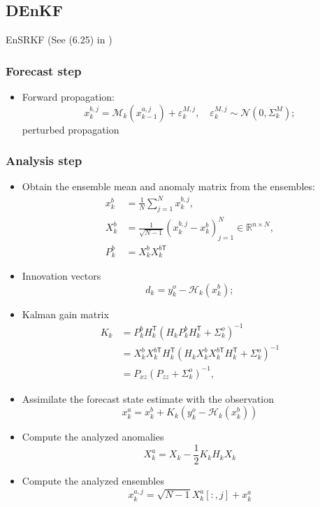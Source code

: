 \documentclass{article}
\newcommand{\trans}{\mathsf{T}}
\begin{document}
\subsection{DEnKF}
EnSRKF (See (6.25) in \cite{Bocquet2016})
\subsubsection{Forecast step}
\begin{itemize}
	\item Forward propagation:
	      $$
		      x_k^{b,j}=\mathcal{M}_k(x_{k-1}^{a,j})+\varepsilon_k^{M,j},\quad \varepsilon_k^{M,j}\sim\mathcal{N}(0,\Sigma_k^M);
	      $$
	      perturbed propagation
\end{itemize}

\subsubsection{Analysis step}
\begin{itemize}
	\item Obtain the ensemble mean and anomaly matrix from the ensembles:
	      \begin{align*}
		      x_k^b & = \frac1N\sum_{j=1}^Nx_k^{b,j},                                           \\
		      X_k^b & = \frac1{\sqrt{N-1}}(x_k^{b,j} - x_k^b)_{j=1}^N\in\mathbb{R}^{n\times N}, \\
		      P_k^b & = X_k^bX_k^{b\trans}
	      \end{align*}
	\item Innovation vectors
	      $$
		      d_k = y_k^o - \mathcal{H}_k(x_k^b);
	      $$
	\item Kalman gain matrix
	      \begin{align*}
		      K_k & = P_k^bH_k^\trans (H_kP_k^bH_k^\trans +\Sigma_k^o)^{-1}                           \\
		          & = X_k^bX_k^{b\trans}H_k^\trans (H_kX_k^bX_k^{b\trans}H_k^\trans +\Sigma_k^o)^{-1} \\
		          & = P_{xz}(P_{zz}+\Sigma_k^o)^{-1},
	      \end{align*}
	\item Assimilate the forecast state estimate with the observation
	      $$
		      x_k^a = x_k^b + K_k(y_k^o - \mathcal{H}_k(x_k^b))
	      $$
	\item Compute the analyzed anomalies
	      $$
		      X_k^a = X_k-\frac12K_kH_kX_k
	      $$
	\item Compute the analyzed ensembles
	      $$
		      x_k^{a,j} = \sqrt{N-1}X_k^a[:, j] + x_k^a
	      $$
\end{itemize}
\end{document}

